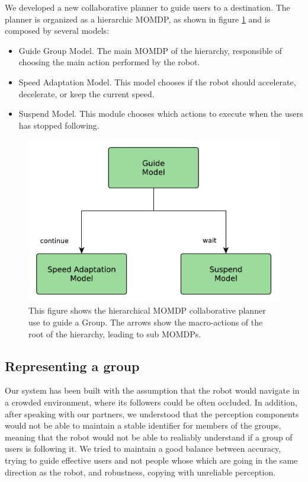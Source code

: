 We developed a new collaborative planner to guide users to a destination. The planner is organized as a hierarchic MOMDP, as shown in figure \ref{fig:case_study-spencer-guide_planner} and is composed by several models:
\begin{itemize}
\item Guide Group Model. The main MOMDP of the hierarchy, responsible of choosing the main action performed by the robot.
\item Speed Adaptation Model. This model chooses if the robot should accelerate, decelerate, or keep the current speed.
\item Suspend Model. This module chooses which actions to execute when the users has stopped following.
\end{itemize}



\begin{figure}[ht!]
	\centering
	\includegraphics[scale=0.45]{img/case_study/spencer/guide_planner.pdf}
	\caption[Collaborative planner for guiding]{This figure shows the hierarchical MOMDP collaborative planner use to guide a Group. The arrows show the macro-actions of the root of the hierarchy, leading to sub MOMDPs.}
	\label{fig:case_study-spencer-guide_planner}
\end{figure}

\subsection{Representing a group}
Our system has been built with the assumption that the robot would navigate in a crowded environment, where its followers could be often occluded. In addition, after speaking with our partners, we understood that the perception components would not be able to maintain a stable identifier for members of the groups, meaning that the robot would not be able to realiably understand if a group of users is following it. We tried to maintain a good balance between accuracy, trying to guide effective users and not people whose which are going in the same direction as the robot, and robustness, copying with unreliable perception.


